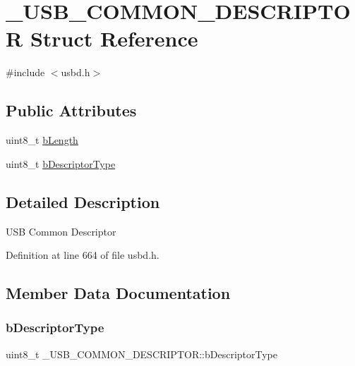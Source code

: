\hypertarget{struct___u_s_b___c_o_m_m_o_n___d_e_s_c_r_i_p_t_o_r}{}\section{\+\_\+\+U\+S\+B\+\_\+\+C\+O\+M\+M\+O\+N\+\_\+\+D\+E\+S\+C\+R\+I\+P\+T\+OR Struct Reference}
\label{struct___u_s_b___c_o_m_m_o_n___d_e_s_c_r_i_p_t_o_r}


{\ttfamily \#include $<$usbd.\+h$>$}

\subsection*{Public Attributes}
\begin{DoxyCompactItemize}
\item 
uint8\+\_\+t \hyperlink{struct___u_s_b___c_o_m_m_o_n___d_e_s_c_r_i_p_t_o_r_a3b232c5c49b059c8df010496ca69868b}{b\+Length}
\item 
uint8\+\_\+t \hyperlink{struct___u_s_b___c_o_m_m_o_n___d_e_s_c_r_i_p_t_o_r_a67186df405d9bc8ed78bcf60926be924}{b\+Descriptor\+Type}
\end{DoxyCompactItemize}


\subsection{Detailed Description}
U\+SB Common Descriptor 

Definition at line 664 of file usbd.\+h.



\subsection{Member Data Documentation}
\mbox{\label{struct___u_s_b___c_o_m_m_o_n___d_e_s_c_r_i_p_t_o_r_a67186df405d9bc8ed78bcf60926be924}} 
\subsubsection{\texorpdfstring{b\+Descriptor\+Type}{bDescriptorType}}
{\footnotesize\ttfamily uint8\+\_\+t \+\_\+\+U\+S\+B\+\_\+\+C\+O\+M\+M\+O\+N\+\_\+\+D\+E\+S\+C\+R\+I\+P\+T\+O\+R\+::b\+Descriptor\+Type}

